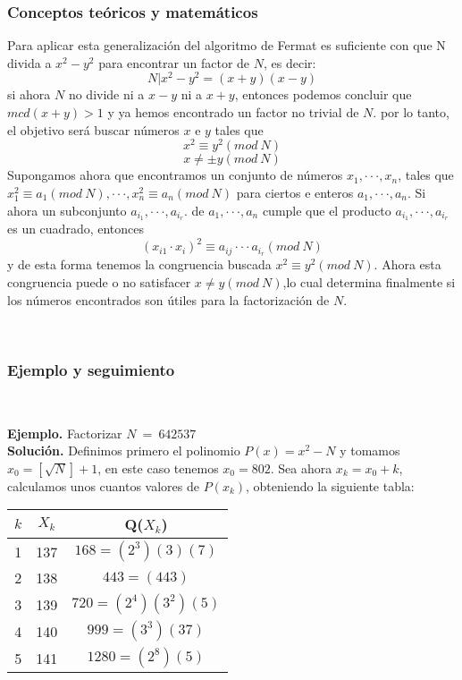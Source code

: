 \documentclass[11pt, conference]{IEEEtran}
\begin{document}
\subsubsection[Conceptos teóricos y matemáticos]{\textbf{Conceptos teóricos y matemáticos}}
\cite{b}Para aplicar esta generalización del algoritmo de Fermat es suficiente con que N divida a $x^2-y^2$ para encontrar un factor de $N$, es decir:
\[
	N|x^2-y^2=(x+y)(x-y)
\]
si ahora $N$ no divide ni a $x-y$ ni a $x+y$, entonces podemos concluir que $mcd(x+y)>1$ y ya hemos encontrado un factor no trivial de $N$. por lo tanto, el objetivo será buscar números $x$ e $y$ tales que 
\[x^2\equiv y^2(mod\ N)\]
\[x \neq \pm y(mod\ N)\]
Supongamos ahora que encontramos un conjunto de números $x_1,\cdot \cdot \cdot,x_n$, tales que $x_1^2 \equiv a_1(mod\ N),\cdot \cdot \cdot,x_n^2\equiv a_n(mod\ N)$ para ciertos e enteros $a_1,\cdot \cdot \cdot,a_n$. Si ahora un subconjunto $a_{i_1},\cdot \cdot \cdot,a_{i_r}$. de $a_1,\cdot \cdot \cdot,a_n$ cumple que el producto $a_{i_1},\cdot \cdot \cdot,a_{i_r}$ es un cuadrado, entonces
\[
	(x_{i1}\cdot x_i)^2 \equiv a_{ij}\cdot \cdot \cdot a_{i_r}(mod\ N)
\]
y de esta forma tenemos la congruencia buscada $x^2\equiv y^2 (mod\ N)$. Ahora esta congruencia puede o no satisfacer $x\neq y(mod\ N)$,lo cual determina finalmente si los números encontrados son útiles para la factorización de $N$.

\

\subsubsection[Ejemplo y seguimiento]{\textbf{Ejemplo y seguimiento}}

\

\textbf{Ejemplo.} Factorizar $N\ =\ 642537$\\ 
\textbf{Solución.} Definimos primero el polinomio $P(x) = x^2-N$ y tomamos $x_0=[\sqrt{N}]+1$, en este caso tenemos $x_0=802$. Sea ahora $x_k = x_0+k$, calculamos unos cuantos valores de $P(x_k)$, obteniendo la siguiente tabla:

\begin{table}[htb]
	\begin{center}
		\begin{tabular}{c|c|c}
				$k$& \textbf{$X_k$} & \textbf{Q($X_k$)} \\
			\hline
			1 & 137 & $168=(2^3)(3)(7)$ \\ 
			2 & 138 & $443=(443)$ \\ 
			3 & 139 & $720=(2^4)(3^2)(5)$ \\
			4 & 140 & $999=(3^3)(37)$ \\ 
			5 & 141 & $1280=(2^8)(5)$ \\ 
		\end{tabular}
	\end{center}
\end{table}
\pagebreak
\end{document}
